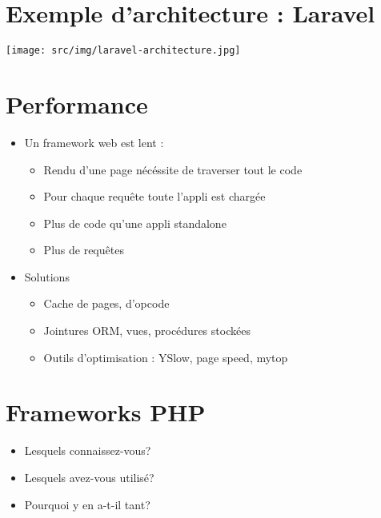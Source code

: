 \hypertarget{exemple-darchitecture-laravel}{%
\section{Exemple d'architecture :
Laravel}\label{exemple-darchitecture-laravel}}

\texttt{[image: src/img/laravel-architecture.jpg]}

\hypertarget{performance}{%
\section{Performance}\label{performance}}

\begin{itemize}
\tightlist
\item
  Un framework web est lent :

  \begin{itemize}
  \tightlist
  \item
    Rendu d'une page nécéssite de traverser tout le code
  \item
    Pour chaque requête toute l'appli est chargée
  \item
    Plus de code qu'une appli standalone
  \item
    Plus de requêtes
  \end{itemize}
\item
  Solutions

  \begin{itemize}
  \tightlist
  \item
    Cache de pages, d'opcode
  \item
    Jointures ORM, vues, procédures stockées
  \item
    Outils d'optimisation : YSlow, page speed, mytop
  \end{itemize}
\end{itemize}

\hypertarget{frameworks-php}{%
\section{Frameworks PHP}\label{frameworks-php}}

\begin{itemize}
\tightlist
\item
  Lesquels connaissez-vous?
\item
  Lesquels avez-vous utilisé?
\item
  Pourquoi y en a-t-il tant?
\end{itemize}

